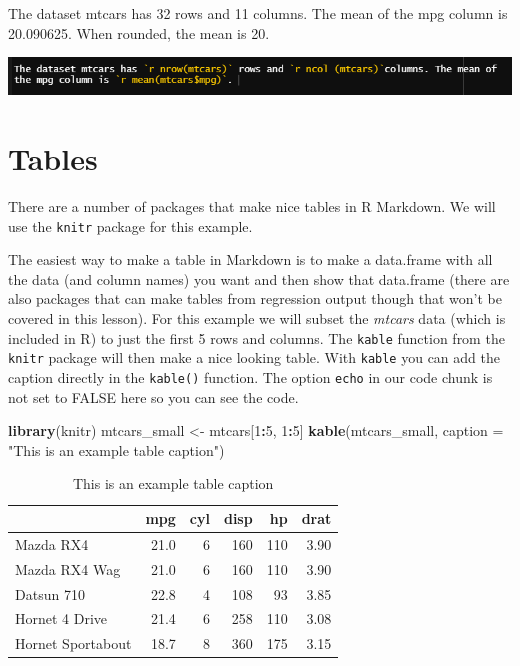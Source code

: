 \documentclass[
  12pt,
]{book}
\newenvironment{Shaded}{\begin{snugshade}}{\end{snugshade}}
\newcommand{\DataTypeTok}[1]{\textcolor[rgb]{0.27,0.27,0.27}{#1}}
\newcommand{\DecValTok}[1]{\textcolor[rgb]{0.06,0.06,0.06}{#1}}
\newcommand{\KeywordTok}[1]{\textcolor[rgb]{0.27,0.27,0.27}{\textbf{#1}}}
\newcommand{\NormalTok}[1]{#1}
\newcommand{\OperatorTok}[1]{\textcolor[rgb]{0.43,0.43,0.43}{\textbf{#1}}}
\newcommand{\StringTok}[1]{\textcolor[rgb]{0.5,0.5,0.5}{#1}}
\begin{document}
The dataset mtcars has 32 rows and 11 columns. The mean of the mpg column is 20.090625. When rounded, the mean is 20.

\includegraphics{images/inline_code.PNG}

\hypertarget{tables}{%
\section{Tables}\label{tables}}

There are a number of packages that make nice tables in R Markdown. We will use the \texttt{knitr} package for this example.

The easiest way to make a table in Markdown is to make a data.frame with all the data (and column names) you want and then show that data.frame (there are also packages that can make tables from regression output though that won't be covered in this lesson). For this example we will subset the \emph{mtcars} data (which is included in R) to just the first 5 rows and columns. The \texttt{kable} function from the \texttt{knitr} package will then make a nice looking table. With \texttt{kable} you can add the caption directly in the \texttt{kable()} function. The option \texttt{echo} in our code chunk is not set to FALSE here so you can see the code.

\begin{Shaded}
\begin{Highlighting}[]
\KeywordTok{library}\NormalTok{(knitr)}
\NormalTok{mtcars\_small <{-}}\StringTok{ }\NormalTok{mtcars[}\DecValTok{1}\OperatorTok{:}\DecValTok{5}\NormalTok{, }\DecValTok{1}\OperatorTok{:}\DecValTok{5}\NormalTok{]}
\KeywordTok{kable}\NormalTok{(mtcars\_small, }\DataTypeTok{caption =} \StringTok{"This is an example table caption"}\NormalTok{)}
\end{Highlighting}
\end{Shaded}

\begin{table}

\caption{\label{tab:unnamed-chunk-1}This is an example table caption}
\centering
\begin{tabular}[t]{l|r|r|r|r|r}
\hline
  & mpg & cyl & disp & hp & drat\\
\hline
Mazda RX4 & 21.0 & 6 & 160 & 110 & 3.90\\
\hline
Mazda RX4 Wag & 21.0 & 6 & 160 & 110 & 3.90\\
\hline
Datsun 710 & 22.8 & 4 & 108 & 93 & 3.85\\
\hline
Hornet 4 Drive & 21.4 & 6 & 258 & 110 & 3.08\\
\hline
Hornet Sportabout & 18.7 & 8 & 360 & 175 & 3.15\\
\hline
\end{tabular}
\end{table}
\end{document}
